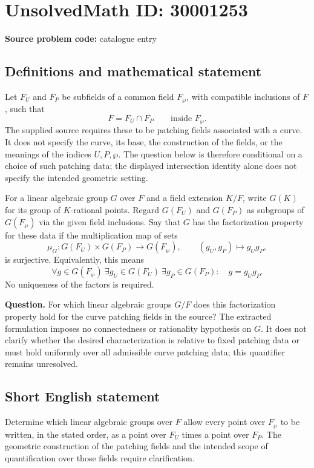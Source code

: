 \documentclass[11pt]{article}
\begin{document}
\section*{UnsolvedMath ID: 30001253}
\textbf{Source problem code:} catalogue entry
\subsection{Definitions and mathematical statement}
Let \(F_U\) and \(F_P\) be subfields of a common field \(F_{\wp}\), with compatible inclusions of \(F\), such that
\[
F=F_U\cap F_P\qquad\text{inside }F_{\wp}.
\]
The supplied source requires these to be patching fields associated with a curve. It does not specify the curve, its base, the construction of the fields, or the meanings of the indices \(U,P,\wp\). The question below is therefore conditional on a choice of such patching data; the displayed intersection identity alone does not specify the intended geometric setting.

For a linear algebraic group \(G\) over \(F\) and a field extension \(K/F\), write \(G(K)\) for its group of \(K\)-rational points. Regard \(G(F_U)\) and \(G(F_P)\) as subgroups of \(G(F_{\wp})\) via the given field inclusions. Say that \(G\) has the factorization property for these data if the multiplication map of sets
\[
\mu_G:G(F_U)\times G(F_P)\longrightarrow G(F_{\wp}),\qquad (g_U,g_P)\longmapsto g_Ug_P,
\]
is surjective. Equivalently, this means
\[
\forall g\in G(F_{\wp})\ \exists g_U\in G(F_U)\ \exists g_P\in G(F_P):\quad g=g_Ug_P.
\]
No uniqueness of the factors is required.

\textbf{Question.} For which linear algebraic groups \(G/F\) does this factorization property hold for the curve patching fields in the source? The extracted formulation imposes no connectedness or rationality hypothesis on \(G\). It does not clarify whether the desired characterization is relative to fixed patching data or must hold uniformly over all admissible curve patching data; this quantifier remains unresolved.
\subsection{Short English statement}
Determine which linear algebraic groups over \(F\) allow every point over \(F_{\wp}\) to be written, in the stated order, as a point over \(F_U\) times a point over \(F_P\). The geometric construction of the patching fields and the intended scope of quantification over those fields require clarification.
\end{document}
